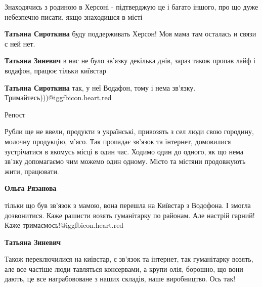  
 
 
 
 
\zzSecCmt

\begin{itemize} %

Знаходячись з родиною в Херсоні - підтверджую це і багато іншого, про що дуже
небезпечно писати, якщо знаходишся в місті

\begin{itemize} %
\textbf{Татьяна Сироткина} буду поддерживать Херсон! Моя мама там осталась и связи с ней нет.

\textbf{Татьяна Зиневич} в нас не було зв'язку декілька днів, зараз також пропав лайф і водафон, працює тільки київстар

\textbf{Татьяна Сироткина} так, у неї Водафон, тому і нема зв’язку. Тримайтесь)))@igg{fbicon.heart.red}
\end{itemize} %

Репост


Рубли ще не ввели, продукти э українські, привозять з сел люди свою городину,
молочну продукцію, м'ясо. Так пропадає зв'язок та інтернет, домовилися
зустрічатися в якомусь місці в один час. Ходимо один до одного, як що нема
зв'зку допомагаємо чим можемо один одному. Місто та містяни продовжують жити,
працювати.

\begin{itemize} %
\textbf{Ольга Рязанова} 

тільки що був зв’язок з мамою, вона перешла на Київстар з Водофона. І змогла
дозвонитися. Каже рашисти возять гуманітарку по районам. Але настрій гарний!
Каже тримаємось!@igg{fbicon.heart.red}

\textbf{Татьяна Зиневич} 

Також переключилися на київстар, є зв'язок та інтернет, так гуманітарку возять,
але все частіше люди тавляться консервами, а крупи олія, борошно, що вони
дають, це все награбововане з наших складів, наше виробництво. Ось так!


\end{itemize}
\end{itemize}
